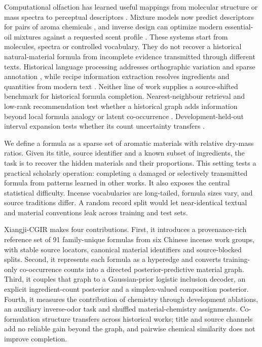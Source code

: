 \documentclass[12pt]{article}
\begin{document}
Computational olfaction has learned useful mappings from molecular structure or mass spectra to perceptual descriptors \cite{ref4,ref5,ref6,ref7,ref8}. Mixture models now predict descriptors for pairs of aroma chemicals \cite{ref9}, and inverse design can optimize modern essential-oil mixtures against a requested scent profile \cite{ref10}. These systems start from molecules, spectra or controlled vocabulary. They do not recover a historical natural-material formula from incomplete evidence transmitted through different texts. Historical language processing addresses orthographic variation and sparse annotation \cite{ref11}, while recipe information extraction resolves ingredients and quantities from modern text \cite{ref12}. Neither line of work supplies a source-shifted benchmark for historical formula completion. Nearest-neighbour retrieval and low-rank recommendation test whether a historical graph adds information beyond local formula analogy or latent co-occurrence \cite{ref16,ref17}. Development-held-out interval expansion tests whether its count uncertainty transfers \cite{ref18}.

We define a formula as a sparse set of aromatic materials with relative dry-mass ratios. Given its title, source identifier and a known subset of ingredients, the task is to recover the hidden materials and their proportions. This setting tests a practical scholarly operation: completing a damaged or selectively transmitted formula from patterns learned in other works. It also exposes the central statistical difficulty. Incense vocabularies are long-tailed, formula sizes vary, and source traditions differ. A random record split would let near-identical textual and material conventions leak across training and test sets.

Xiangji-CGIR makes four contributions. First, it introduces a provenance-rich reference set of 91 family-unique formulas from six Chinese incense work groups, with stable source locators, canonical material identifiers and source-blocked splits. Second, it represents each formula as a hyperedge and converts training-only co-occurrence counts into a directed posterior-predictive material graph. Third, it couples that graph to a Gaussian-prior logistic inclusion decoder, an explicit ingredient-count posterior and a simplex-valued composition posterior. Fourth, it measures the contribution of chemistry through development ablations, an auxiliary inverse-odor task and shuffled material-chemistry assignments. Co-formulation structure transfers across historical works; title and source channels add no reliable gain beyond the graph, and pairwise chemical similarity does not improve completion.
\end{document}
